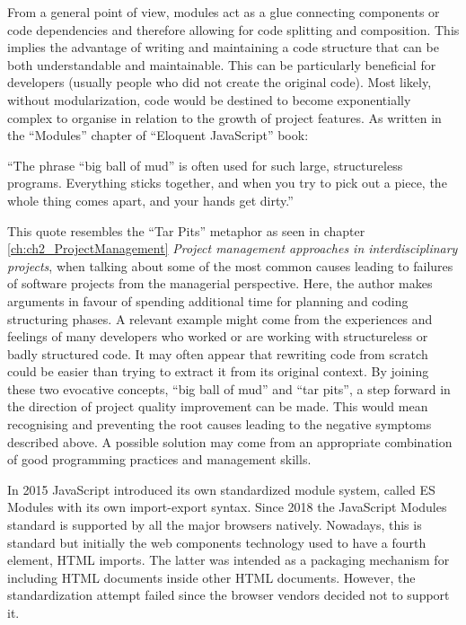 From a general point of view, modules act as a glue connecting components or code dependencies and therefore allowing for code splitting and composition. This implies the advantage of writing and maintaining a code structure that can be both understandable and maintainable. This can be particularly beneficial for developers (usually people who did not create the original code). Most likely, without modularization, code would be destined to become exponentially complex to organise in relation to the growth of project features.
As written in the “Modules” chapter of “Eloquent JavaScript” book:

\begin{displayquote}

“The phrase “big ball of mud” is often used for such large, structureless programs. Everything sticks together, and when you try to pick out a piece, the whole thing comes apart, and your hands get dirty.”

\end{displayquote}

This quote resembles the “Tar Pits” metaphor as seen in chapter \ref{ch:ch2_ProjectManagement} \emph{Project management approaches in interdisciplinary projects}, when talking about some of the most common causes leading to failures of software projects from the managerial perspective. Here, the author makes arguments in favour of spending additional time for planning and coding structuring phases. A relevant example might come from the experiences and feelings of many developers who worked or are working with structureless or badly structured code. It may often appear that rewriting code from scratch could be easier than trying to extract it from its original context. 
By joining these two evocative concepts, “big ball of mud” and “tar pits”, a step forward in the direction of project quality improvement can be made. This would mean recognising and preventing the root causes leading to the negative symptoms described above. A possible solution may come from an appropriate combination of good programming practices and management skills.

In 2015 JavaScript introduced its own standardized module system, called ES Modules with its own import-export syntax. Since 2018 the JavaScript Modules standard is supported by all the major browsers natively. Nowadays, this is standard but initially the web components technology used to have a fourth element, HTML imports. The latter was intended as a packaging mechanism for including HTML documents inside other HTML documents. However, the standardization attempt failed since the browser vendors decided not to support it.

